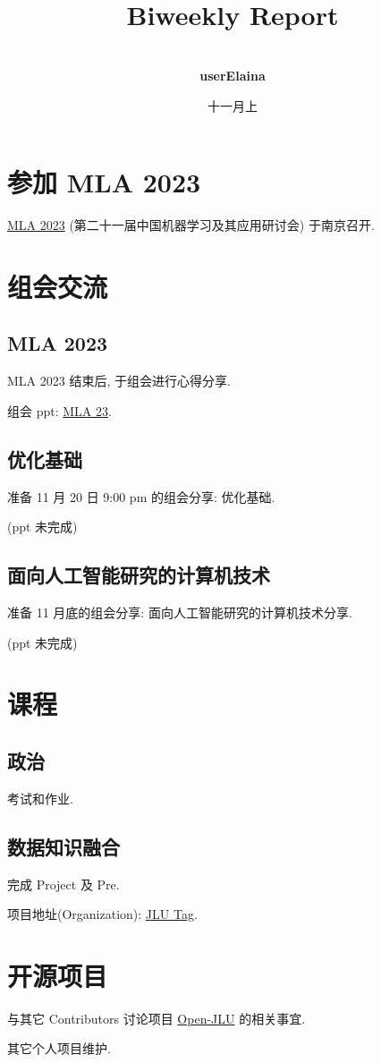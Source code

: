 \documentclass[a4paper]{article}
\title{
    \vspace*{1.0in}
     \\
    \vspace*{1in}
    \textbf{\Huge Biweekly Report}
    \vspace{0.5in}
}
\author{ \\
    \textbf{\huge userElaina} \\
    \vspace*{1in}
}
\date{\LARGE 十一月上}
\begin{document}
\LARGE

\maketitle
\tableofcontents
\thispagestyle{empty}
\newpage

\section{参加 MLA 2023}

\href{https://www.lamda.nju.edu.cn/conf/mla23/index.html}{MLA 2023} (第二十一届中国机器学习及其应用研讨会) 于南京召开.

\section{组会交流}

\subsection{MLA 2023}

MLA 2023 结束后, 于组会进行心得分享.

组会 ppt: \href{https://github.com/mscelaina/ppt-mla23}{MLA 23}.

\subsection{优化基础}

准备 11 月 20 日 9:00 pm 的组会分享: 优化基础.

(ppt 未完成)

\subsection{面向人工智能研究的计算机技术}

准备 11 月底的组会分享: 面向人工智能研究的计算机技术分享.

(ppt 未完成)

\section{课程}

\subsection{政治}

考试和作业.

\subsection{数据知识融合}

完成 Project 及 Pre.

项目地址(Organization): \href{https://github.com/KDI-2023}{JLU Tag}.

\section{开源项目}

与其它 Contributors 讨论项目 \href{https://github.com/userElaina/Open-JLU}{Open-JLU} 的相关事宜.

其它个人项目维护.
\end{document}
